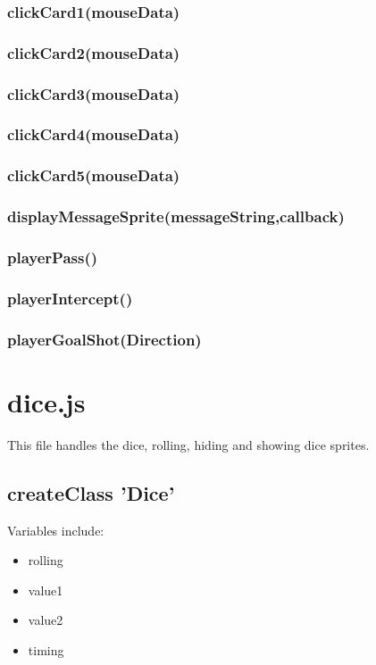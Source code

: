 \documentclass[12pt]{article}
\begin{document}
\subsubsection*{clickCard1(mouseData)}

\subsubsection*{clickCard2(mouseData)}

\subsubsection*{clickCard3(mouseData)}

\subsubsection*{clickCard4(mouseData)}

\subsubsection*{clickCard5(mouseData)}

\subsubsection*{displayMessageSprite(messageString,callback)}

\subsubsection*{playerPass()}

\subsubsection*{playerIntercept()}

\subsubsection*{playerGoalShot(Direction)}

\section*{dice.js}
This file handles the dice, rolling, hiding and showing dice 
sprites.  
\subsection*{createClass 'Dice'}
Variables include: 
\begin{itemize}
\item rolling 
\item value1
\item value2
\item timing
\end{itemize}
\end{document}

